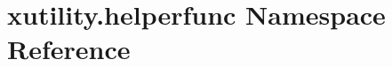 \hypertarget{namespacexutility_1_1helperfunc}{\section{xutility.\-helperfunc Namespace Reference}
\label{namespacexutility_1_1helperfunc}
}
